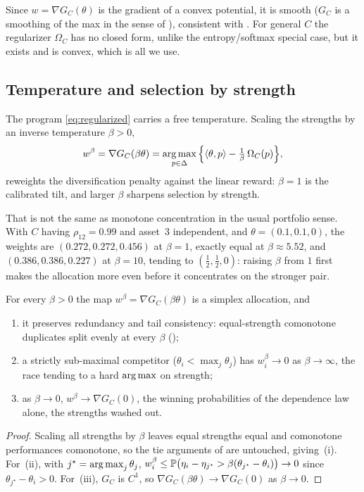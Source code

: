 Since $w = \nabla G_C(\theta)$ is the gradient of a convex potential, it is smooth
($G_C$ is a smoothing of the max in the sense of \textcite{nesterov2005}),
consistent with . For general $C$ the regularizer $\Omega_C$ has no
closed form, unlike the entropy/softmax special case, but it exists and is convex,
which is all we use.

\subsection{Temperature and selection by strength}
\label{sec:temperature}

The program \eqref{eq:regularized} carries a free temperature.
Scaling
the strengths by an inverse temperature $\beta > 0$,
\begin{equation}
  w^{\beta} = \nabla G_C(\beta\theta)
  = \operatorname*{arg\,max}_{p\in\Delta}\Big\{\langle\theta, p\rangle - \tfrac{1}{\beta}\,\Omega_C(p)\Big\},
  \label{eq:temperature}
\end{equation}
reweights the diversification penalty against the linear reward: $\beta = 1$ is
the calibrated tilt, and larger $\beta$ sharpens selection by strength.

That is not
the same as monotone concentration in the usual portfolio sense.
With
$C$ having $\rho_{12}=0.99$ and asset~3 independent, and $\theta=(0.1,0.1,0)$, the
weights are $(0.272, 0.272, 0.456)$ at $\beta=1$, exactly equal at
$\beta\approx5.52$, and $(0.386, 0.386, 0.227)$ at $\beta=10$, tending to
$(\tfrac12,\tfrac12,0)$: raising $\beta$ from $1$ first makes the allocation more
even before it concentrates on the stronger pair.

\begin{lemma}
\label{lem:temperature}
For every $\beta > 0$ the map $w^{\beta} = \nabla G_C(\beta\theta)$ is a simplex
allocation, and
\begin{enumerate}
\item[\textup{(i)}] it preserves redundancy and tail consistency: equal-strength
  comonotone duplicates split evenly at every $\beta$
  ();
\item[\textup{(ii)}] a strictly sub-maximal competitor ($\theta_i < \max_j\theta_j$)
  has $w^{\beta}_i \to 0$ as $\beta\to\infty$, the race tending to a hard
  $\operatorname*{arg\,max}$ on strength;
\item[\textup{(iii)}] as $\beta\to 0$, $w^{\beta}\to\nabla G_C(0)$, the winning
  probabilities of the dependence law alone, the strengths washed out.
\end{enumerate}
\end{lemma}
\begin{proof}
Scaling all strengths by $\beta$ leaves equal strengths equal and comonotone
performances comonotone, so the tie arguments of
 are untouched, giving~(i). For~(ii), with
$j^\star = \operatorname*{arg\,max}_j \theta_j$, $w^{\beta}_i \le
\mathbb{P}\big(\eta_i - \eta_{j^\star} > \beta(\theta_{j^\star} - \theta_i)\big) \to 0$
since $\theta_{j^\star} - \theta_i > 0$. For~(iii), $G_C$ is $C^1$, so
$\nabla G_C(\beta\theta) \to \nabla G_C(0)$ as $\beta\to 0$.
\end{proof}

